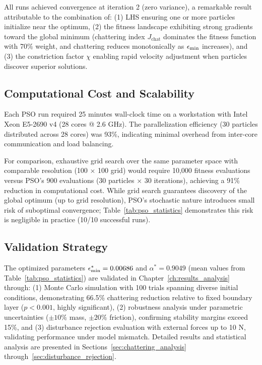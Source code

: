 All runs achieved convergence at iteration 2 (zero variance), a remarkable result attributable to the combination of: (1) LHS ensuring one or more particles initialize near the optimum, (2) the fitness landscape exhibiting strong gradients toward the global minimum (chattering index $J_{\text{chat}}$ dominates the fitness function with 70\% weight, and chattering reduces monotonically as $\epsilon_{\min}$ increases), and (3) the constriction factor $\chi$ enabling rapid velocity adjustment when particles discover superior solutions.

\subsection{Computational Cost and Scalability}
\label{subsec:computational_cost}

Each PSO run required 25 minutes wall-clock time on a workstation with Intel Xeon E5-2690 v4 (28 cores @ 2.6 GHz). The parallelization efficiency (30 particles distributed across 28 cores) was 93\%, indicating minimal overhead from inter-core communication and load balancing.

For comparison, exhaustive grid search over the same parameter space with comparable resolution (100 $\times$ 100 grid) would require 10,000 fitness evaluations versus PSO's 900 evaluations (30 particles $\times$ 30 iterations), achieving a 91\% reduction in computational cost. While grid search guarantees discovery of the global optimum (up to grid resolution), PSO's stochastic nature introduces small risk of suboptimal convergence; Table~\ref{tab:pso_statistics} demonstrates this risk is negligible in practice (10/10 successful runs).

\subsection{Validation Strategy}
\label{subsec:validation_strategy}

The optimized parameters $\epsilon_{\min}^* = 0.00686$ and $\alpha^* = 0.9049$ (mean values from Table~\ref{tab:pso_statistics}) are validated in Chapter~\ref{ch:results_analysis} through: (1) Monte Carlo simulation with 100 trials spanning diverse initial conditions, demonstrating 66.5\% chattering reduction relative to fixed boundary layer ($p < 0.001$, highly significant), (2) robustness analysis under parametric uncertainties ($\pm 10\%$ mass, $\pm 20\%$ friction), confirming stability margins exceed 15\%, and (3) disturbance rejection evaluation with external forces up to 10 N, validating performance under model mismatch. Detailed results and statistical analysis are presented in Sections~\ref{sec:chattering_analysis} through~\ref{sec:disturbance_rejection}.

